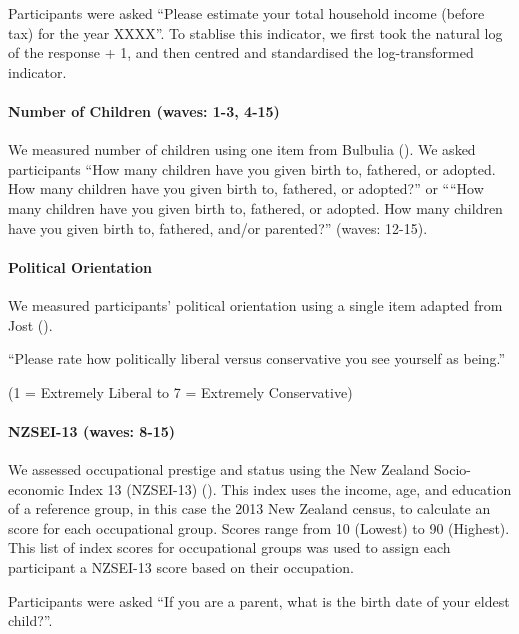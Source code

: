 \documentclass[
  singlecolumn,
  9pt]{article}
\let\oldparagraph\paragraph
\renewcommand{\paragraph}[1]{\oldparagraph{#1}\mbox{}}
\begin{document}
Participants were asked ``Please estimate your total household income
(before tax) for the year XXXX''. To stablise this indicator, we first
took the natural log of the response + 1, and then centred and
standardised the log-transformed indicator.

\paragraph{Number of Children (waves: 1-3,
4-15)}\label{number-of-children-waves-1-3-4-15}

We measured number of children using one item from Bulbulia
(). We asked participants ``How many
children have you given birth to, fathered, or adopted. How many
children have you given birth to, fathered, or adopted?'' or ````How
many children have you given birth to, fathered, or adopted. How many
children have you given birth to, fathered, and/or parented?'' (waves:
12-15).

\paragraph{Political Orientation}\label{political-orientation}

We measured participants' political orientation using a single item
adapted from Jost ().

``Please rate how politically liberal versus conservative you see
yourself as being.''

(1 = Extremely Liberal to 7 = Extremely Conservative)

\paragraph{NZSEI-13 (waves: 8-15)}\label{nzsei-13-waves-8-15}

We assessed occupational prestige and status using the New Zealand
Socio-economic Index 13 (NZSEI-13) (). This index uses the income, age, and education of
a reference group, in this case the 2013 New Zealand census, to
calculate an score for each occupational group. Scores range from 10
(Lowest) to 90 (Highest). This list of index scores for occupational
groups was used to assign each participant a NZSEI-13 score based on
their occupation.

Participants were asked ``If you are a parent, what is the birth date of
your eldest child?''.
\end{document}
